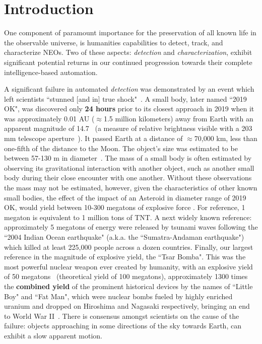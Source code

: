 \chapter{Introduction}

One component of paramount importance for the preservation of all known life in
the observable universe, is humanities capabilities to detect, track, and
characterize \glspl{NEO}. Two of these aspects: \textit{detection} and
\textit{characterization}, exhibit significant potential returns in our
continued progression towards their complete intelligence-based automation.

A significant failure in automated \textit{detection} was demonstrated by an
event which left scientists {``stunned [and in] true shock"}~\cite{chiu_2019}. A
small body, later named ``2019 OK",  was discovered only \textbf{24 hours} prior
to its closest approach in 2019 when it was approximately 0.01 AU ($\approx$1.5
million kilometers) away from Earth with an apparent magnitude of
14.7~\cite{IAU2019OK} (a measure of relative brightness visible with a 203 mm
telescope aperture~\cite[p.~24]{North2014}). It passed Earth at a distance of
$\approx$70,000 km, less than one-fifth of the distance to the Moon. The %
 object's size was estimated to be between 57-130 m in
diameter~\cite{NASA2019}. The mass of a small body is often estimated by
observing its gravitational interaction with another object, such as another
small body during their close encounter with one another. Without these
observations the mass may not be estimated, however, given the characteristics
of other known small bodies, the effect of the impact of an Asteroid in diameter
range of 2019 OK, would yield between 10-300 megatons of explosive force
\cite{Cellino1999, Rumpf2017}. For reference, 1 megaton is equivalent to 1
million tons of TNT. A next widely known reference: approximately 5 megatons of
energy were released by tsunami waves following the ``2004 Indian Ocean
earthquake" (a.k.a. the ``Sumatra-Andaman earthquake") \cite{Nirupama2006} which
killed at least 225,000 people across a dozen countries. Finally, our largest
reference in the magnitude of explosive yield, the ``Tsar Bomba". This was the
most powerful nuclear weapon ever created by humanity, with an explosive yield
of 50 megatons~\cite{Khan2020} (theoretical yield of 100 megatons),
approximately 1300 times the \textbf{combined yield} of the prominent historical
devices by the names of ``Little Boy" and ``Fat Man", which were nuclear bombs
fueled by highly enriched uranium and dropped on Hiroshima and Nagasaki
respectively, bringing an end to World War II~\cite{osti_1489669}.
There is consensus amongst scientists on the cause of the failure: objects
approaching in some directions of the sky towards Earth, can exhibit a slow
apparent motion.


